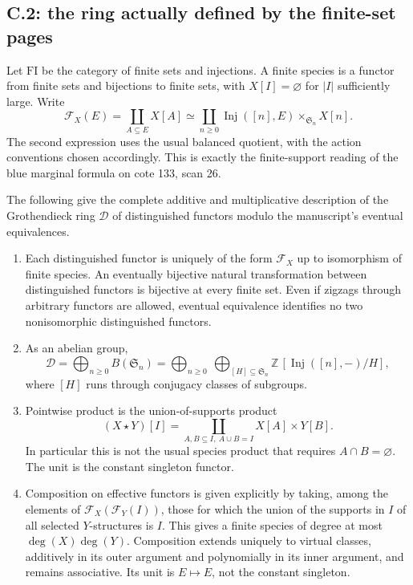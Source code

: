 \subsection{C.2: the ring actually defined by the finite-set pages}

Let $\mathrm{FI}$ be the category of finite sets and injections. A finite
species is a functor from finite sets and bijections to finite sets, with
$X[I]=\varnothing$ for $|I|$ sufficiently large. Write
\[
 \mathcal F_X(E)=\coprod_{A\subseteq E}X[A]
 \simeq\coprod_{n\geq0}\operatorname{Inj}([n],E)
                 \mathbin{\times}_{\mathfrak S_n}X[n].
\]
The second expression uses the usual balanced quotient, with the action
conventions chosen accordingly. This is exactly the finite-support reading
of the blue marginal formula on cote 133, scan 26.

\begin{theorem}
\label{C:distinguished_ring}
The following give the complete additive and multiplicative description of
the Grothendieck ring $\mathcal D$ of distinguished functors modulo the
manuscript's eventual equivalences.
\begin{enumerate}
\item Each distinguished functor is uniquely of the form $\mathcal F_X$ up
to isomorphism of finite species. An eventually bijective natural
transformation between distinguished functors is bijective at every finite
set. Even if zigzags through arbitrary functors are allowed, eventual
equivalence identifies no two nonisomorphic distinguished functors.
\item As an abelian group,
\[
 \mathcal D=\bigoplus_{n\geq0}B(\mathfrak S_n)
 =\bigoplus_{n\geq0}\ 
   \bigoplus_{[H]\subseteq\mathfrak S_n}\mathbb Z\,[\operatorname{Inj}([n],-)/H],
\]
where $[H]$ runs through conjugacy classes of subgroups.
\item Pointwise product is the union-of-supports product
\[
 (X\star Y)[I]=\coprod_{A,B\subseteq I,\ A\cup B=I}X[A]\times Y[B].
\]
In particular this is not the usual species product that requires
$A\cap B=\varnothing$. The unit is the constant singleton functor.
\item Composition on effective functors is given explicitly by taking,
among the elements of $\mathcal F_X(\mathcal F_Y(I))$, those for which the
union of the supports in $I$ of all selected $Y$-structures is $I$.
This gives a finite species of degree at most $\deg(X)\deg(Y)$.
Composition extends uniquely to virtual classes, additively in its outer
argument and polynomially in its inner argument, and remains associative.
Its unit is $E\mapsto E$, not the constant singleton.
\end{enumerate}
\end{theorem}

